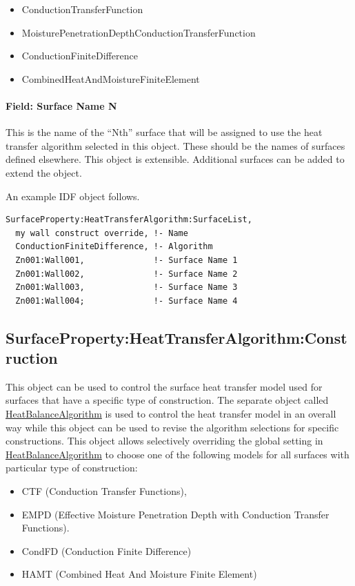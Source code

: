 \begin{itemize}
\item
  ConductionTransferFunction
\item
  MoisturePenetrationDepthConductionTransferFunction
\item
  ConductionFiniteDifference
\item
  CombinedHeatAndMoistureFiniteElement
\end{itemize}

\paragraph{Field: Surface Name N}\label{field-surface-name-n}

This is the name of the ``Nth'' surface that will be assigned to use the heat transfer algorithm selected in this object. These should be the names of surfaces defined elsewhere. This object is extensible. Additional surfaces can be added to extend the object.

An example IDF object follows.

\begin{lstlisting}
SurfaceProperty:HeatTransferAlgorithm:SurfaceList,
  my wall construct override, !- Name
  ConductionFiniteDifference, !- Algorithm
  Zn001:Wall001,              !- Surface Name 1
  Zn001:Wall002,              !- Surface Name 2
  Zn001:Wall003,              !- Surface Name 3
  Zn001:Wall004;              !- Surface Name 4
\end{lstlisting}

\subsection{SurfaceProperty:HeatTransferAlgorithm:Construction}\label{surfacepropertyheattransferalgorithmconstruction}

This object can be used to control the surface heat transfer model used for surfaces that have a specific type of construction. The separate object called \hyperref[heatbalancealgorithm]{HeatBalanceAlgorithm} is used to control the heat transfer model in an overall way while this object can be used to revise the algorithm selections for specific constructions. This object allows selectively overriding the global setting in \hyperref[heatbalancealgorithm]{HeatBalanceAlgorithm} to choose one of the following models for all surfaces with particular type of construction:

\begin{itemize}
\item
  CTF (Conduction Transfer Functions),
\item
  EMPD (Effective Moisture Penetration Depth with Conduction Transfer Functions).
\item
  CondFD (Conduction Finite Difference)
\item
  HAMT (Combined Heat And Moisture Finite Element)
\end{itemize}

